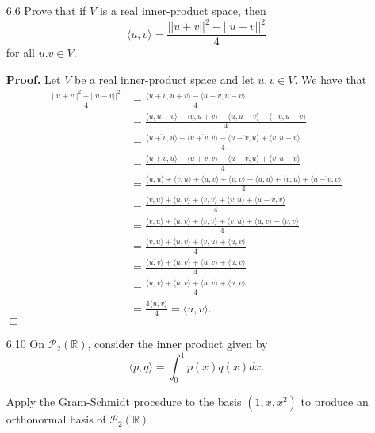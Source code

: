 \documentclass[9pt]{article}
\newcommand{\qed}{\hfill \ensuremath{\Box}}
\newcommand{\R}{\mathbb{R}}
\newcommand{\cyc}[1]{\langle #1 \rangle}
\begin{document}
\begin{enumerate}
   \item[6.6]  Prove that if $V$ is a real inner-product space, then
               $$\cyc{u, v} = \frac{||u + v||^2 - ||u - v||^2}{4}$$
               for all $u. v \in V$.

      \textbf{Proof.} Let $V$ be a real inner-product space and let
      $u, v \in V$. We have that
      \begin{align*}
         \frac{||u + v||^2 - ||u - v||^2}{4}
            &= \frac{\cyc{u + v, u + v} - \cyc{u - v, u - v}}{4} \\
            &= \frac{\cyc{u, u + v} + \cyc{v, u + v} -
                     \cyc{u, u - v} - \cyc{-v, u - v}}{4} \\
            &= \frac{\cyc{\overline{u + v, u}} + \cyc{\overline{u + v, v}} -
                     \cyc{\overline{u - v, u}} + \cyc{v, u - v}}{4} \\
            &= \frac{\cyc{u + v, u} + \cyc{u + v, v} -
                     \cyc{u - v, u} + \cyc{v, u - v}}{4} \\
            &= \frac{\cyc{u, u} + \cyc{v, u} + \cyc{u, v} + \cyc{v, v} -
                     \cyc{u, u} + \cyc{v, u} + \cyc{\overline{u - v, v}}}{4} \\
            &= \frac{\cyc{v, u} + \cyc{u, v} + \cyc{v, v} + 
                     \cyc{v, u} + \cyc{u - v, v}}{4} \\
            &= \frac{\cyc{v, u} + \cyc{u, v} + \cyc{v, v} + 
                     \cyc{v, u} + \cyc{u, v} - \cyc{v, v}}{4} \\
            &= \frac{\cyc{v, u} + \cyc{u, v} + \cyc{v, u} + \cyc{u, v}}{4} \\
            &= \frac{\cyc{\overline{u, v}} + \cyc{u, v} + \cyc{\overline{u, v}} + \cyc{u, v}}{4} \\
            &= \frac{\cyc{u, v} + \cyc{u, v} + \cyc{u, v} + \cyc{u, v}}{4} \\
            &= \frac{4\cyc{u, v}}{4} = \cyc{u, v}.
      \end{align*} \qed
   \item[6.10] On $\mathcal{P}_2(\R)$, consider the inner product given by
               $$\cyc{p, q} = \int_0^1p(x)q(x) dx.$$

               Apply the Gram-Schmidt procedure to the basis $(1, x, x^2)$ to
               produce an orthonormal basis of $\mathcal{P}_2(\R)$.


\end{enumerate}
\end{document}

